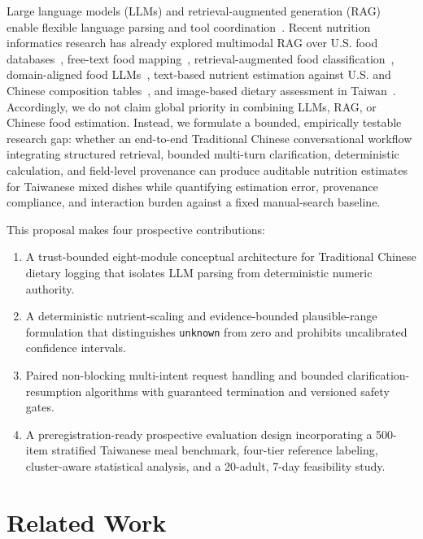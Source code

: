 \documentclass[conference]{IEEEtran}
\begin{document}
Large language models (LLMs) and retrieval-augmented generation (RAG)~\cite{lewis2020rag} enable flexible language parsing and tool coordination~\cite{yao2023react}. Recent nutrition informatics research has already explored multimodal RAG over U.S. food databases~\cite{yan2025dietai24}, free-text food mapping~\cite{lemay2026foodmapper}, retrieval-augmented food classification~\cite{zhou2026nutrirag}, domain-aligned food LLMs~\cite{gjorgjevikj2026foodyllm}, text-based nutrient estimation against U.S. and Chinese composition tables~\cite{lawabni2026text,cao2026chinese}, and image-based dietary assessment in Taiwan~\cite{chen2025diabot}. Accordingly, we do not claim global priority in combining LLMs, RAG, or Chinese food estimation. Instead, we formulate a bounded, empirically testable research gap: whether an end-to-end Traditional Chinese conversational workflow integrating structured retrieval, bounded multi-turn clarification, deterministic calculation, and field-level provenance can produce auditable nutrition estimates for Taiwanese mixed dishes while quantifying estimation error, provenance compliance, and interaction burden against a fixed manual-search baseline.

This proposal makes four prospective contributions:
\begin{enumerate}
    \item A trust-bounded eight-module conceptual architecture for Traditional Chinese dietary logging that isolates LLM parsing from deterministic numeric authority.
    \item A deterministic nutrient-scaling and evidence-bounded plausible-range formulation that distinguishes \texttt{unknown} from zero and prohibits uncalibrated confidence intervals.
    \item Paired non-blocking multi-intent request handling and bounded clarification-resumption algorithms with guaranteed termination and versioned safety gates.
    \item A preregistration-ready prospective evaluation design incorporating a 500-item stratified Taiwanese meal benchmark, four-tier reference labeling, cluster-aware statistical analysis, and a 20-adult, 7-day feasibility study.
\end{enumerate}

\section{Related Work}
\end{document}

